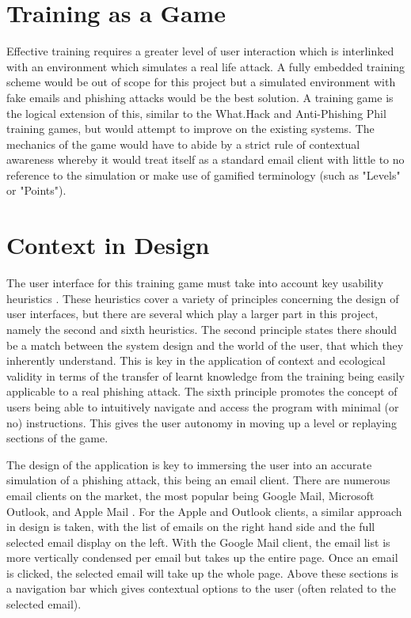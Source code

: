 \documentclass{l4proj}
\begin{document}
\section{Training as a Game}
Effective training requires a greater level of user interaction which is interlinked with an environment which simulates a real life attack. A fully embedded training scheme would be out of scope for this project but a simulated environment with fake emails and phishing attacks would be the best solution. A training game is the logical extension of this, similar to the What.Hack and Anti-Phishing Phil training games, but would attempt to improve on the existing systems. The mechanics of the game would have to abide by a strict rule of contextual awareness whereby it would treat itself as a standard email client with little to no reference to the simulation or make use of gamified terminology (such as "Levels" or "Points").

\section{Context in Design}
The user interface for this training game must take into account key usability heuristics \citep{nielsen2005ten}. These heuristics cover a variety of principles concerning the design of user interfaces, but there are several which play a larger part in this project, namely the second and sixth heuristics. The second principle states there should be a match between the system design and the world of the user, that which they inherently understand. This is key in the application of context and ecological validity in terms of the transfer of learnt knowledge from the training being easily applicable to a real phishing attack. The sixth principle promotes the concept of users being able to intuitively navigate and access the program with minimal (or no) instructions. This gives the user autonomy in moving up a level or replaying sections of the game.

The design of the application is key to immersing the user into an accurate simulation of a phishing attack, this being an email client. There are numerous email clients on the market, the most popular being Google Mail, Microsoft Outlook, and Apple Mail \citep{emailclientlitmus}. For the Apple and Outlook clients, a similar approach in design is taken, with the list of emails on the right hand side and the full selected email display on the left. With the Google Mail client, the email list is more vertically condensed per email but takes up the entire page. Once an email is clicked, the selected email will take up the whole page. Above these sections is a navigation bar which gives contextual options to the user (often related to the selected email). 
\end{document}
